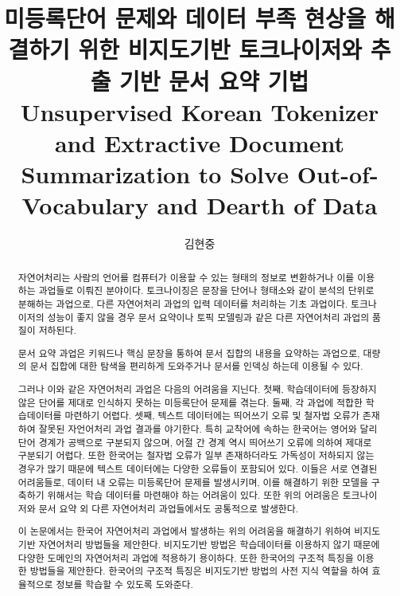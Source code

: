 \documentclass[11pt]{article}
\begin{document}
\title{미등록단어 문제와 데이터 부족 현상을 해결하기 위한 비지도기반 토크나이저와 추출 기반 문서 요약 기법\\
Unsupervised Korean Tokenizer and Extractive Document Summarization to Solve Out-of-Vocabulary and Dearth of Data}
\author{김현중}
\maketitle
\begin{abstract}
자연어처리는 사람의 언어를 컴퓨터가 이용할 수 있는 형태의 정보로 변환하거나 이를 이용하는 과업들로 이뤄진 분야이다.
토크나이징은 문장을 단어나 형태소와 같이 분석의 단위로 분해하는 과업으로, 다른 자연어처리 과업의 입력 데이터를 처리하는 기초 과업이다.
토크나이저의 성능이 좋지 않을 경우 문서 요약이나 토픽 모델링과 같은 다른 자연어처리 과업의 품질이 저하된다.

문서 요약 과업은 키워드나 핵심 문장을 통하여 문서 집합의 내용을 요약하는 과업으로, 대량의 문서 집합에 대한 탐색을 편리하게 도와주거나 문서를 인덱싱 하는데 이용될 수 있다.

그러나 이와 같은 자연어처리 과업은 다음의 어려움을 지닌다.
첫째, 학습데이터에 등장하지 않은 단어를 제대로 인식하지 못하는 미등록단어 문제를 겪는다.
둘째, 각 과업에 적합한 학습데이터를 마련하기 어렵다.
셋째, 텍스트 데이터에는 띄어쓰기 오류 및 철자법 오류가 존재하여 잘못된 자언어처리 과업 결과를 야기한다.
특히 교착어에 속하는 한국어는 영어와 달리 단어 경계가 공백으로 구분되지 않으며, 어절 간 경계 역시 띄어쓰기 오류에 의하여 제대로 구분되기 어렵다.
또한 한국어는 철자법 오류가 일부 존재하더라도 가독성이 저하되지 않는 경우가 많기 때문에 텍스트 데이터에는 다양한 오류들이 포함되어 있다.
이들은 서로 연결된 어려움들로, 데이터 내 오류는 미등록단어 문제를 발생시키며, 이를 해결하기 위한 모델을 구축하기 위해서는 학습 데이터를 마련해야 하는 어려움이 있다.
또한 위의 어려움은 토크나이저와 문서 요약 외 다른 자연어처리 과업들에서도 공통적으로 발생한다.

이 논문에서는 한국어 자연어처리 과업에서 발생하는 위의 어려움을 해결하기 위하여 비지도기반 자연어처리 방법들을 제안한다.
비지도기반 방법은 학습데이터를 이용하지 않기 때문에 다양한 도메인의 자연어처리 과업에 적용하기 용이하다.
또한 한국어의 구조적 특징을 이용한 방법들을 제안한다.
한국어의 구조적 특징은 비지도기반 방법의 사전 지식 역할을 하여 효율적으로 정보를 학습할 수 있도록 도와준다.


\end{abstract}
\end{document}
